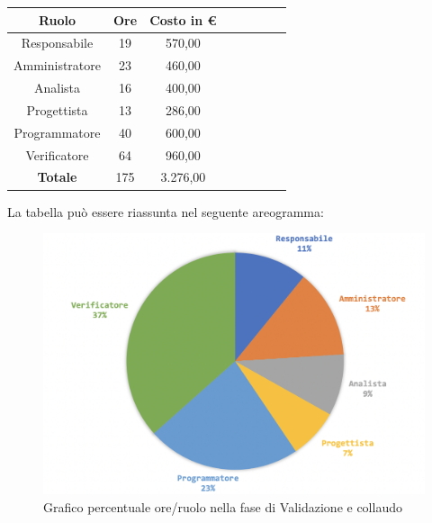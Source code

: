		\begin{longtable}{|c|c|c|c|c|c|c|c}
			\hline
			\rowcolor{lighter-grayer}
			\textbf{Ruolo} & \textbf{Ore} & \textbf{Costo in € } \\
			\hline
			\endfirsthead
			
			\hline
			Responsabile 	    & 19 & 570,00\\
			\hline 
			\hline
			Amministratore	  & 23 & 460,00\\
			\hline
			\hline
			Analista 				& 16 & 400,00\\
			\hline
			\hline
			Progettista 		  & 13 & 286,00\\
			\hline
			\hline
			Programmatore 	 & 40 & 600,00\\
			\hline
			\hline
			Verificatore 		  & 64 & 960,00\\
			\hline
			\textbf{Totale} 	& 175 & 3.276,00\\
			\hline
			
		\end{longtable}
		\pagebreak
		
		La tabella può essere riassunta nel seguente areogramma:
		\begin{figure}[H]
			\centering
			\includegraphics[width=0.8\linewidth]{./images/validColl2.png}
			\caption{Grafico percentuale ore/ruolo nella fase di Validazione e collaudo}
			\label{fig:grafico costi ruolo fase Validazione e collaudo}
		\end{figure}
	
	
	